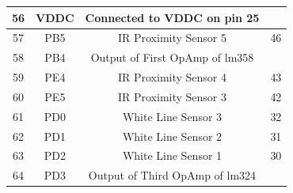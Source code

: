 \documentclass[a4paper,10pt,oneside]{article}
\begin{document}
{\begin{longtable}{|c|c|c|c|}
				56 &	VDDC &	Connected to VDDC on pin 25&\\ \hline
				57 &	PB5	 &	IR Proximity Sensor 5&46\\ \hline
				58 &	PB4	 &	Output of First OpAmp of lm358&\\ \hline
				59 &	PE4	 &	IR Proximity Sensor 4&43 \\ \hline
				60 &	PE5	 &	IR Proximity Sensor 3&42\\ \hline
				61 &	PD0	 &	White Line Sensor 3&32 \\ \hline
				62 &	PD1	 &	White Line Sensor 2&31\\ \hline
				63 &	PD2	 &	White Line Sensor 1&30 \\ \hline
				64 &	PD3	 &	Output of Third OpAmp of lm324\\ \hline
			\end{longtable}
}
\end{document}
